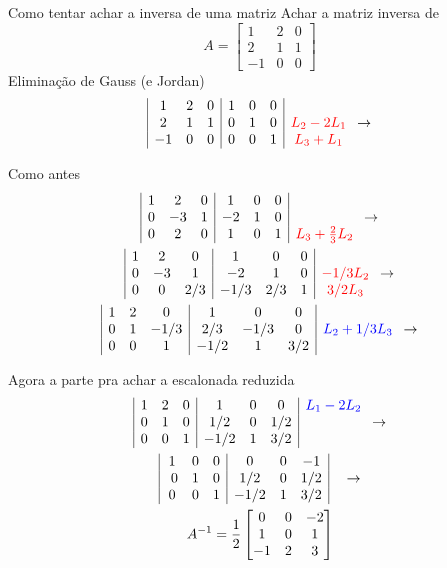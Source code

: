 \documentclass{beamer}
\begin{document}
\begin{frame}{Como tentar achar a inversa de uma matriz}
Achar a matriz inversa de 
$$ A = \begin{bmatrix}
  1 & 2 & 0 \\
  2 & 1 & 1 \\
  -1 & 0 & 0
\end{bmatrix}$$
Eliminação de Gauss (e Jordan)
$$ 
\begin{array}{|ccc|ccc|c}
  1&2&0&1&0&0& \\
  2&1&1&0&1&0& \textcolor{red}{L_2 -2L_1}\\
  -1&0&0&0&0&1&\textcolor{red}{L_3 + L_1}
\end{array}\rightarrow
$$
\end{frame}

\begin{frame}{Como antes}
  \begin{gather*} 
  \begin{array}{|ccc|ccc|c}
    1&2&0&1&0&0& \\
    0&-3&1&-2&1&0& \\
    0&2&0&1&0&1&\textcolor{red}{L_3 + \frac{2}{3}L_2}
  \end{array}\rightarrow\\
\begin{array}{|ccc|ccc|c}
    1&2&0&1&0&0& \\
    0&-3&1&-2&1&0& \textcolor{red}{-1/3L_2} \\
    0&0&2/3&-1/3&2/3&1& \textcolor{red}{3/2L_3}
  \end{array}\rightarrow\\
  \begin{array}{|ccc|ccc|c}
    1&2&0&1&0&0& \\
    0&1&-1/3&2/3&-1/3&0& \textcolor{blue}{L_2+1/3L_3} \\
    0&0&1&-1/2&1&3/2& 
  \end{array}\rightarrow
\end{gather*}
 \end{frame}

\begin{frame}{Agora a parte pra achar a escalonada reduzida}
\begin{gather*}
  \begin{array}{|ccc|ccc|c}
    1&2&0&1&0&0&\textcolor{blue}{L_1-2L_2} \\
    0&1& 0& 1/2&0& 1/2&  \\
    0&0&1&-1/2&1&3/2& 
  \end{array}\rightarrow \\
    \begin{array}{|ccc|ccc|c}
      1&0&0&0&0&-1&\\\
      0&1& 0& 1/2&0& 1/2&  \\
      0&0&1&-1/2&1&3/2& 
    \end{array}\rightarrow\\
    A^{-1} = \frac{1}{2}\begin{bmatrix}
      0 & 0 & -2 \\
      1 & 0 & 1 \\
      -1 & 2 & 3
    \end{bmatrix}
  \end{gather*}
\end{frame}
\end{document}
